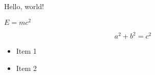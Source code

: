 

Hello, world!

$E=mc^2$

\begin{equation}
a^2 + b^2 = c^2
\end{equation}

\begin{itemize}
    \item Item 1
    \item Item 2
\end{itemize}

